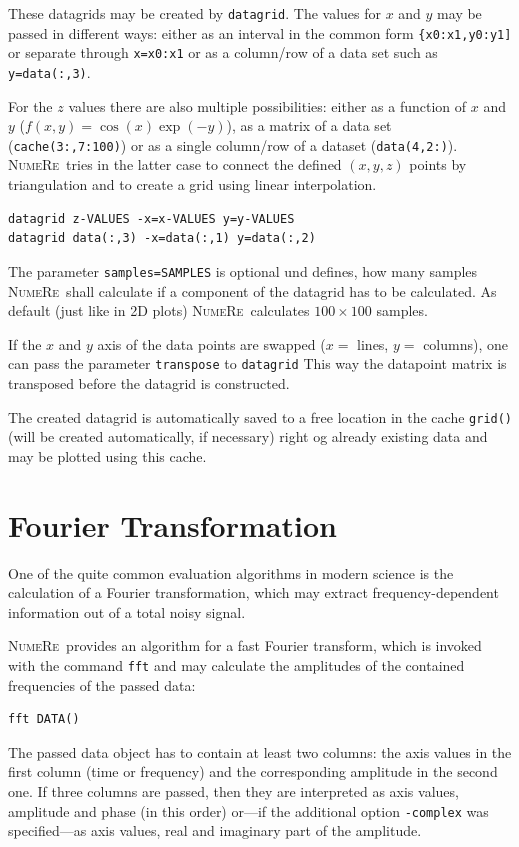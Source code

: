 \documentclass[DIV=14,headsepline,footsepline]{scrbook}
\newcommand{\NR}{\textsc{Nu\-me\-Re}}
\begin{document}
				These datagrids may be created by \verb+datagrid+. The values for $x$ and $y$ may be passed in different ways: either as an interval in the common form \verb+{x0:x1,y0:y1]+ or separate through \verb+x=x0:x1+ or as a column/row of a data set such as \verb+y=data(:,3)+.
				
				For the $z$ values there are also multiple possibilities: either as a function of $x$ and $y$ ($f(x,y) = \cos(x)\exp(-y)$), as a matrix of a data set (\verb+cache(3:,7:100)+) or as a single column/row of a dataset (\verb+data(4,2:)+). \NR\ tries in the latter case to connect the defined $(x,y,z)$ points by triangulation and to create a grid using linear interpolation.
				\begin{lstlisting}
datagrid z-VALUES -x=x-VALUES y=y-VALUES
datagrid data(:,3) -x=data(:,1) y=data(:,2)
				\end{lstlisting}
				
				The parameter \verb+samples=SAMPLES+ is optional und defines, how many samples \NR\ shall calculate if a component of the datagrid has to be calculated. As default (just like in 2D plots) \NR\ calculates $100\times100$ samples.
				
				If the $x$ and $y$ axis of the data points are swapped ($x =$ lines, $y=$ columns), one can pass the parameter \verb+transpose+ to \verb+datagrid+ This way the datapoint matrix is transposed before the datagrid is constructed.
	
				The created datagrid is automatically saved to a free location in the cache \verb+grid()+ (will be created automatically, if necessary) right og already existing data and may be plotted using this cache.
				
			\section{Fourier Transformation}
				One of the quite common evaluation algorithms in modern science is the calculation of a Fourier transformation, which may extract frequency-dependent information out of a total noisy signal.
				
				\NR\ provides an algorithm for a fast Fourier transform, which is invoked with the command \verb+fft+ and may calculate the amplitudes of the contained frequencies of the passed data:
				\begin{lstlisting}
fft DATA()
				\end{lstlisting}
				The passed data object has to contain at least two columns: the axis values in the first column (time or frequency) and the corresponding amplitude in the second one. If three columns are passed, then they are interpreted as axis values, amplitude and phase (in this order) or---if the additional option \verb+-complex+ was specified---as axis values, real and imaginary part of the amplitude.
				
\end{document}
